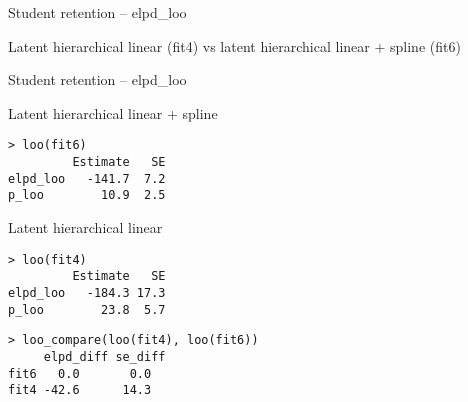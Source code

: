 \documentclass[english,t]{beamer}
\begin{document}
\begin{frame}[fragile]{Student retention -- elpd\_loo}

  \vspace{-0.7\baselineskip}
  
\hspace{-5mm}Latent hierarchical linear (fit4) vs latent hierarchical linear + spline (fit6)


\end{frame}

\begin{frame}[fragile]{Student retention -- elpd\_loo}

  {\color{gray}
Latent hierarchical linear + spline
\begin{verbatim}
> loo(fit6)
         Estimate   SE
elpd_loo   -141.7  7.2
p_loo        10.9  2.5
\end{verbatim}

Latent hierarchical linear
\begin{verbatim}
> loo(fit4)
         Estimate   SE
elpd_loo   -184.3 17.3
p_loo        23.8  5.7
\end{verbatim}
}

\begin{verbatim}
> loo_compare(loo(fit4), loo(fit6))
     elpd_diff se_diff
fit6   0.0       0.0  
fit4 -42.6      14.3  
\end{verbatim}

\end{frame}
\end{document}
